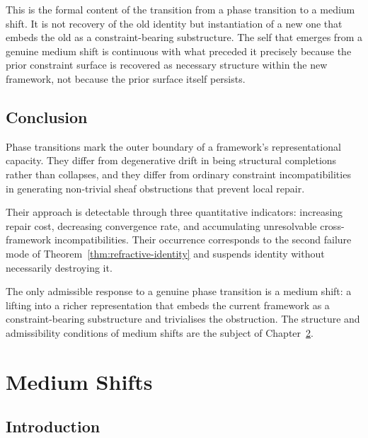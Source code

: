 \documentclass[11pt,openany]{book}
\begin{document}
This is the formal content of the transition from a phase
transition to a medium shift.  It is not recovery of the
old identity but instantiation of a new one that embeds the
old as a constraint-bearing substructure.  The self that
emerges from a genuine medium shift is continuous with what
preceded it precisely because the prior constraint surface
is recovered as necessary structure within the new
framework, not because the prior surface itself persists.

\section{Conclusion}
\label{sec:conclusion-phase}

Phase transitions mark the outer boundary of a framework's
representational capacity.  They differ from degenerative
drift in being structural completions rather than
collapses, and they differ from ordinary constraint
incompatibilities in generating non-trivial sheaf
obstructions that prevent local repair.

Their approach is detectable through three quantitative
indicators: increasing repair cost, decreasing convergence
rate, and accumulating unresolvable cross-framework
incompatibilities.  Their occurrence corresponds to the
second failure mode of Theorem~\ref{thm:refractive-identity}
and suspends identity without necessarily destroying it.

The only admissible response to a genuine phase transition
is a medium shift: a lifting into a richer representation
that embeds the current framework as a constraint-bearing
substructure and trivialises the obstruction.  The
structure and admissibility conditions of medium shifts are
the subject of Chapter~\ref{ch:medium-shifts}.


\chapter{Medium Shifts}
\label{ch:medium-shifts}

\section{Introduction}
\label{sec:intro-medium}
\end{document}
